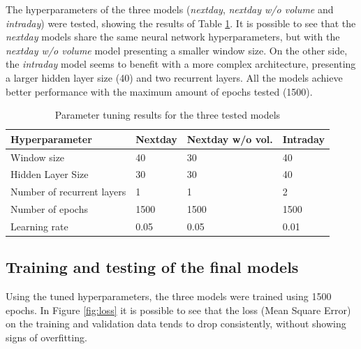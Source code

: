 \documentclass[10pt,twocolumn,letterpaper]{article}
\begin{document}
The hyperparameters of the three models (\textit{nextday}, \textit{nextday w/o volume} and \textit{intraday}) were tested, showing the results of Table \ref{table:tuning_res}. It is possible to see that the \textit{nextday} models share the same neural network hyperparameters, but with the \textit{nextday w/o volume} model presenting a smaller window size. On the other side, the \textit{intraday} model seems to benefit with a more complex architecture, presenting a larger hidden layer size (40) and two recurrent layers. All the models achieve better performance with the maximum amount of epochs tested (1500).

\begin{table}[H]
	\begin{center}
		\begin{tabular}{|p{2.9cm}|p{1cm}|p{1.3cm}|p{1.1cm}|}
			\hline
			Hyperparameter & Nextday & Nextday w/o vol. & Intraday \\
			\hline\hline
			Window size & 40 & 30 & 40 \\
			Hidden Layer Size & 30 & 30 & 40 \\
			Number of recurrent layers & 1 & 1 & 2 \\
			Number of epochs & 1500 & 1500 & 1500 \\
			Learning rate & 0.05 & 0.05 & 0.01 \\
			\hline
		\end{tabular}
	\end{center}
	\caption{Parameter tuning results for the three tested models}
	\label{table:tuning_res}
\end{table}

\subsection{Training and testing of the final models}

Using the tuned hyperparameters, the three models were trained using 1500 epochs. In Figure \ref{fig:loss} it is possible to see that the loss (Mean Square Error) on the training and validation data tends to drop consistently, without showing signs of overfitting.
\end{document}
